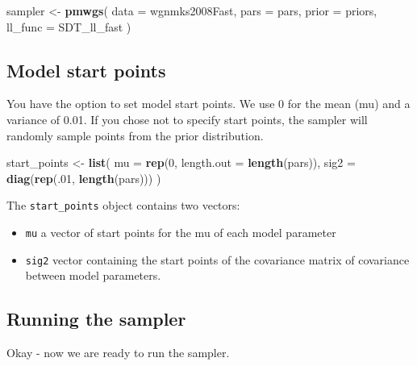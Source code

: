 \documentclass[]{book}
\newenvironment{Shaded}{\begin{snugshade}}{\end{snugshade}}
\newcommand{\DataTypeTok}[1]{\textcolor[rgb]{0.13,0.29,0.53}{#1}}
\newcommand{\DecValTok}[1]{\textcolor[rgb]{0.00,0.00,0.81}{#1}}
\newcommand{\KeywordTok}[1]{\textcolor[rgb]{0.13,0.29,0.53}{\textbf{#1}}}
\newcommand{\NormalTok}[1]{#1}
\newcommand{\StringTok}[1]{\textcolor[rgb]{0.31,0.60,0.02}{#1}}
\providecommand{\tightlist}{%
  \setlength{\itemsep}{0pt}\setlength{\parskip}{0pt}}
\begin{document}
\begin{Shaded}
\begin{Highlighting}[]
\NormalTok{sampler <-}\StringTok{ }\KeywordTok{pmwgs}\NormalTok{(}
  \DataTypeTok{data =}\NormalTok{ wgnmks2008Fast,}
  \DataTypeTok{pars =}\NormalTok{ pars,}
  \DataTypeTok{prior =}\NormalTok{ priors,}
  \DataTypeTok{ll_func =}\NormalTok{ SDT_ll_fast}
\NormalTok{)}
\end{Highlighting}
\end{Shaded}

\hypertarget{start-points}{%
\subsection{Model start points}\label{start-points}}

You have the option to set model start points. We use 0 for the mean (mu) and a variance of 0.01. If you chose not to specify start points, the sampler will randomly sample points from the prior distribution.

\begin{Shaded}
\begin{Highlighting}[]
\NormalTok{start_points <-}\StringTok{ }\KeywordTok{list}\NormalTok{(}
  \DataTypeTok{mu =} \KeywordTok{rep}\NormalTok{(}\DecValTok{0}\NormalTok{, }\DataTypeTok{length.out =} \KeywordTok{length}\NormalTok{(pars)),}
  \DataTypeTok{sig2 =} \KeywordTok{diag}\NormalTok{(}\KeywordTok{rep}\NormalTok{(.}\DecValTok{01}\NormalTok{, }\KeywordTok{length}\NormalTok{(pars)))}
\NormalTok{)}
\end{Highlighting}
\end{Shaded}

The \texttt{start\_points} object contains two vectors:

\begin{itemize}
\tightlist
\item
  \texttt{mu} a vector of start points for the mu of each model parameter
\item
  \texttt{sig2} vector containing the start points of the covariance matrix of covariance between model parameters.
\end{itemize}

\hypertarget{run-sdtsampler}{%
\subsection{Running the sampler}\label{run-sdtsampler}}

Okay - now we are ready to run the sampler.
\end{document}
